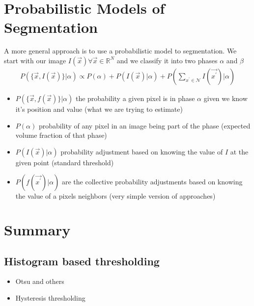 \documentclass[letterpaper,10pt,english]{sphinxmanual}
\begin{document}
\noindent{}


\chapter{Probabilistic Models of Segmentation}
\label{\detokenize{05-AdvancedSegmentation:probabilistic-models-of-segmentation}}
\sphinxAtStartPar
A more general approach is to use a probabilistic model to segmentation. We start with our image \(I(\vec{x}) \forall \vec{x}\in \mathbb{R}^N\) and we classify it into two phases \(\alpha\) and \(\beta\)
\begin{equation*}
\begin{split}P(\{\vec{x} , I(\vec{x})\}  | \alpha) \propto P(\alpha) + P(I(\vec{x}) | \alpha)+  P(\sum_{x^{\prime} \in \mathcal{N}} I(\vec{x^{\prime}}) |  \alpha)\end{split}
\end{equation*}\begin{itemize}
\item {} 
\sphinxAtStartPar
\(P(\{\vec{x} , f(\vec{x})\}  | \alpha)\) the probability a given pixel is in phase \(\alpha\) given we know it’s position and value (what we are trying to estimate)

\item {} 
\sphinxAtStartPar
\(P(\alpha)\) probability of any pixel in an image being part of the phase (expected volume fraction of that phase)

\item {} 
\sphinxAtStartPar
\(P(I(\vec{x}) | \alpha)\) probability adjustment based on knowing the value of \(I\) at the given point (standard threshold)

\item {} 
\sphinxAtStartPar
\(P(f(\vec{x^{\prime}}) |  \alpha)\) are the collective probability adjustments based on knowing the value of a pixels neighbors (very simple version of  approaches)

\end{itemize}


\chapter{Summary}
\label{\detokenize{05-AdvancedSegmentation:summary}}

\section{Histogram based thresholding}
\label{\detokenize{05-AdvancedSegmentation:histogram-based-thresholding}}\begin{itemize}
\item {} 
\sphinxAtStartPar
Otsu and others

\item {} 
\sphinxAtStartPar
Hysteresis thresholding

\end{itemize}
\end{document}
